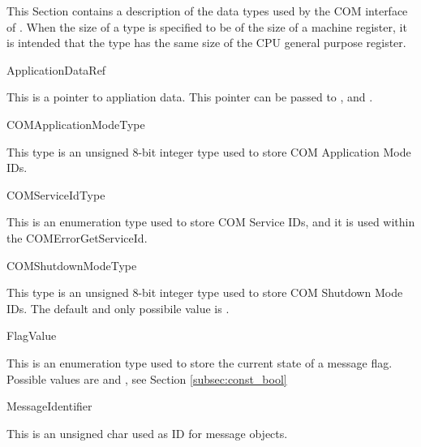 This Section contains a description of the data types used by the COM
interface of \ee. When the size of a type is specified to be of the
size of a machine register, it is intended that the type has the same
size of the CPU general purpose register.

\begin{type}{ApplicationDataRef}
  \begin{typedescription}
    This is a pointer to appliation data. This pointer can be passed to 
    ,  and .  
  \end{typedescription}
\end{type}

\begin{type}{COMApplicationModeType}
  \begin{typedescription}
   This type is an unsigned 8-bit integer type used to store COM Application Mode 
   IDs.
  \end{typedescription}
\end{type}

\begin{type}{COMServiceIdType}
  \begin{typedescription}
    This is an enumeration type used to store COM Service IDs, and it is used 
    within the COMErrorGetServiceId.
  \end{typedescription}
\end{type}

\begin{type}{COMShutdownModeType}
  \begin{typedescription}
    This type is an unsigned 8-bit integer type used to store COM Shutdown Mode 
    IDs. The default and only possibile value is . 
  \end{typedescription}
\end{type}

\begin{type}{FlagValue}
  \begin{typedescription}
    This is an enumeration type used to store the current state of a message flag.
    Possible values are  and , see 
    Section \ref{subsec:const_bool}
  \end{typedescription}
\end{type}

\begin{type}{MessageIdentifier}
  \begin{typedescription}
    This is an unsigned char used as ID for message objects.
  \end{typedescription}
\end{type}

